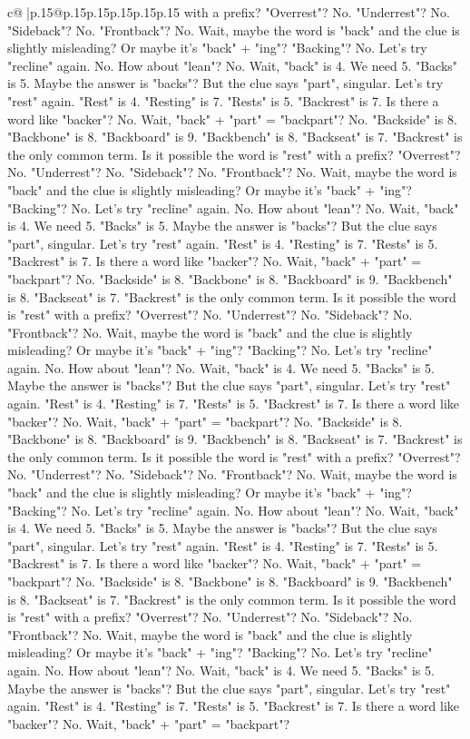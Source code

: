 \documentclass{article}
\begin{document}
{\begin{supertabular}{c@{$\;$}|p{.15\linewidth}@{}p{.15\linewidth}p{.15\linewidth}p{.15\linewidth}p{.15\linewidth}p{.15\linewidth}}
{{{with a prefix? "Overrest"? No. "Underrest"? No. "Sideback"? No. "Frontback"? No. Wait, maybe the word is "back" and the clue is slightly misleading? Or maybe it's "back" + "ing"? "Backing"? No. Let's try "recline" again. No. How about "lean"? No. Wait, "back" is 4. We need 5. "Backs" is 5. Maybe the answer is "backs"? But the clue says "part", singular. Let's try "rest" again. "Rest" is 4. "Resting" is 7. "Rests" is 5. "Backrest" is 7. Is there a word like "backer"? No. Wait, "back" + "part" = "backpart"? No. "Backside" is 8. "Backbone" is 8. "Backboard" is 9. "Backbench" is 8. "Backseat" is 7. "Backrest" is the only common term. Is it possible the word is "rest" with a prefix? "Overrest"? No. "Underrest"? No. "Sideback"? No. "Frontback"? No. Wait, maybe the word is "back" and the clue is slightly misleading? Or maybe it's "back" + "ing"? "Backing"? No. Let's try "recline" again. No. How about "lean"? No. Wait, "back" is 4. We need 5. "Backs" is 5. Maybe the answer is "backs"? But the clue says "part", singular. Let's try "rest" again. "Rest" is 4. "Resting" is 7. "Rests" is 5. "Backrest" is 7. Is there a word like "backer"? No. Wait, "back" + "part" = "backpart"? No. "Backside" is 8. "Backbone" is 8. "Backboard" is 9. "Backbench" is 8. "Backseat" is 7. "Backrest" is the only common term. Is it possible the word is "rest" with a prefix? "Overrest"? No. "Underrest"? No. "Sideback"? No. "Frontback"? No. Wait, maybe the word is "back" and the clue is slightly misleading? Or maybe it's "back" + "ing"? "Backing"? No. Let's try "recline" again. No. How about "lean"? No. Wait, "back" is 4. We need 5. "Backs" is 5. Maybe the answer is "backs"? But the clue says "part", singular. Let's try "rest" again. "Rest" is 4. "Resting" is 7. "Rests" is 5. "Backrest" is 7. Is there a word like "backer"? No. Wait, "back" + "part" = "backpart"? No. "Backside" is 8. "Backbone" is 8. "Backboard" is 9. "Backbench" is 8. "Backseat" is 7. "Backrest" is the only common term. Is it possible the word is "rest" with a prefix? "Overrest"? No. "Underrest"? No. "Sideback"? No. "Frontback"? No. Wait, maybe the word is "back" and the clue is slightly misleading? Or maybe it's "back" + "ing"? "Backing"? No. Let's try "recline" again. No. How about "lean"? No. Wait, "back" is 4. We need 5. "Backs" is 5. Maybe the answer is "backs"? But the clue says "part", singular. Let's try "rest" again. "Rest" is 4. "Resting" is 7. "Rests" is 5. "Backrest" is 7. Is there a word like "backer"? No. Wait, "back" + "part" = "backpart"? No. "Backside" is 8. "Backbone" is 8. "Backboard" is 9. "Backbench" is 8. "Backseat" is 7. "Backrest" is the only common term. Is it possible the word is "rest" with a prefix? "Overrest"? No. "Underrest"? No. "Sideback"? No. "Frontback"? No. Wait, maybe the word is "back" and the clue is slightly misleading? Or maybe it's "back" + "ing"? "Backing"? No. Let's try "recline" again. No. How about "lean"? No. Wait, "back" is 4. We need 5. "Backs" is 5. Maybe the answer is "backs"? But the clue says "part", singular. Let's try "rest" again. "Rest" is 4. "Resting" is 7. "Rests" is 5. "Backrest" is 7. Is there a word like "backer"? No. Wait, "back" + "part" = "backpart"? }}}
\end{supertabular}}
\end{document}
